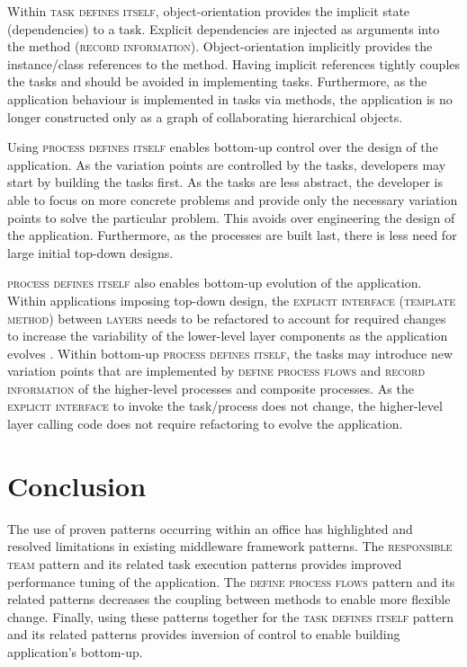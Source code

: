 \documentclass[prodmode]{style/acmlarge}
\begin{document}
Within \textsc{task defines itself}, object-orientation provides the implicit
state (dependencies) to a task.  Explicit dependencies are injected as arguments
into the method (\textsc{record information}).  Object-orientation implicitly
provides the instance/class references to the method.  Having implicit
references tightly couples the tasks and should be avoided in implementing
tasks.  Furthermore, as the application behaviour is implemented in tasks via
methods, the application is no longer constructed only as a graph of
collaborating hierarchical objects.

Using \textsc{process defines itself} enables bottom-up control over the design
of the application.  As the variation points are controlled by the tasks,
developers may start by building the tasks first.  As the tasks are less
abstract, the developer is able to focus on more concrete problems and provide
only the necessary variation points to solve the particular problem.  This
avoids over engineering the design of the application.  Furthermore, as the
processes are built last, there is less need for large initial top-down designs.

\textsc{process defines itself} also enables bottom-up evolution of the
application.  Within applications imposing top-down design, the
\textsc{explicit interface} (\textsc{template method}) between \textsc{layers}
needs to be refactored to account for required changes to increase the
variability of the lower-level layer components as the application evolves
\cite{ioc}.  Within bottom-up \textsc{process defines itself}, the tasks may
introduce new variation points that are implemented by \textsc{define process
flows} and \textsc{record information} of the higher-level processes and
composite processes.  As the \textsc{explicit interface} to invoke the
task/process does not change, the higher-level layer calling code does not
require refactoring to evolve the application.




\section{Conclusion}

The use of proven patterns occurring within an office has highlighted and
resolved limitations in existing middleware framework patterns.  The
\textsc{responsible team} pattern and its related task execution patterns
provides improved performance tuning of the application.  The \textsc{define
process flows} pattern and its related patterns decreases the coupling between
methods to enable more flexible change.  Finally, using these patterns together
for the \textsc{task defines itself} pattern and its related patterns provides
inversion of control to enable building application's bottom-up.
\end{document}
